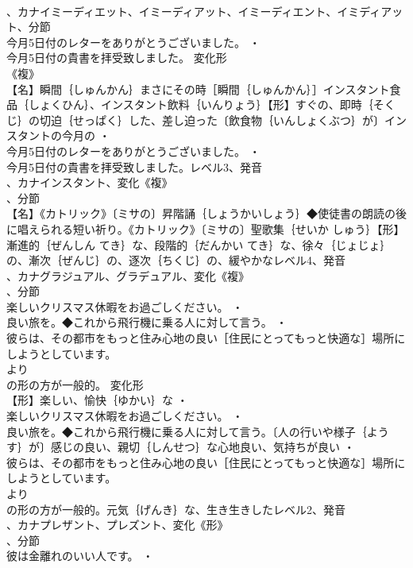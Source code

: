 \documentclass[8pt]{extreport}
\begin{document}
\begin{CJK}{UTF8}{min}
\\	、カナイミーディエット、イミーディアット、イミーディエント、イミディアット、分節
\\	今月5日付のレターをありがとうございました。 ・
\\	今月5日付の貴書を拝受致しました。	変化形 
\\	《複》
\\	【名】瞬間｛しゅんかん｝まさにその時［瞬間｛しゅんかん｝］インスタント食品｛しょくひん｝、インスタント飲料｛いんりょう｝【形】すぐの、即時｛そくじ｝の切迫｛せっぱく｝した、差し迫った〔飲食物｛いんしょくぶつ｝が〕インスタントの今月の ・
\\	今月5日付のレターをありがとうございました。 ・
\\	今月5日付の貴書を拝受致しました。レベル3、発音
\\	、カナインスタント、変化《複》
\\	、分節
\\	【名】《カトリック》〔ミサの〕昇階誦｛しょうかいしょう｝◆使徒書の朗読の後に唱えられる短い祈り。《カトリック》〔ミサの〕聖歌集｛せいか しゅう｝【形】漸進的｛ぜんしん てき｝な、段階的｛だんかい てき｝な、徐々｛じょじょ｝の、漸次｛ぜんじ｝の、逐次｛ちくじ｝の、緩やかなレベル4、発音
\\	、カナグラジュアル、グラデュアル、変化《複》
\\	、分節
\\	楽しいクリスマス休暇をお過ごしください。 ・
\\	良い旅を。◆これから飛行機に乗る人に対して言う。 ・
\\	彼らは、その都市をもっと住み心地の良い［住民にとってもっと快適な］場所にしようとしています。
\\	より
\\	の形の方が一般的。	変化形 
\\	【形】楽しい、愉快｛ゆかい｝な ・
\\	楽しいクリスマス休暇をお過ごしください。 ・
\\	良い旅を。◆これから飛行機に乗る人に対して言う。〔人の行いや様子｛ようす｝が〕感じの良い、親切｛しんせつ｝な心地良い、気持ちが良い ・
\\	彼らは、その都市をもっと住み心地の良い［住民にとってもっと快適な］場所にしようとしています。
\\	より
\\	の形の方が一般的。元気｛げんき｝な、生き生きしたレベル2、発音
\\	、カナプレザント、プレズント、変化《形》
\\	、分節
\\	彼は金離れのいい人です。 ・

\end{CJK}
\end{document}
